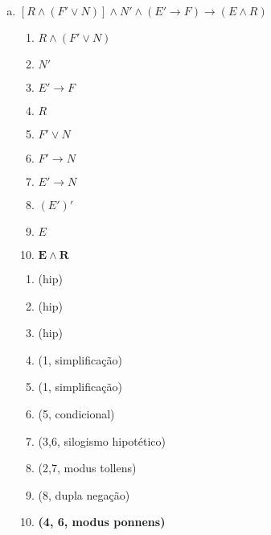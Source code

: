\begin{Gabarito}{12}
\begin{enumerate}[a)]
\begin{multicols}{2}
        \columnbreak

        \begin{enumerate}[\ding{32}]
          \item (hip)
          \item (hip)
          \item (hip)
          \item (1,3, modus tollens)
          \item (5, dupla negação)
          \item (5, condicional)
          \item \textbf{(4, 6, modus ponnens)}
        \end{enumerate}

      \end{multicols}

      \item $[R \land (F' \lor N)] \land N' \land (E'\rightarrow F) \rightarrow (E \land R)$ \\
      \begin{multicols}{2}

        \begin{enumerate}[1.]
          \item $R \land (F' \lor N)$
          \item $N'$
          \item $E'\rightarrow F$
          \item $R$
          \item $F' \lor N$
          \item $F' \rightarrow N$
          \item $E' \rightarrow N$
          \item $(E')'$
          \item $E$
          \item $\boldsymbol{E \land R}$
        \end{enumerate}

        \columnbreak

        \begin{enumerate}[\ding{32}]
          \item (hip)
          \item (hip)
          \item (hip)
          \item (1, simplificação)
          \item (1, simplificação)
          \item (5, condicional)
          \item (3,6, silogismo hipotético)
          \item (2,7, modus tollens)
          \item (8, dupla negação)
          \item \textbf{(4, 6, modus ponnens)}
        \end{enumerate}


\end{multicols}
\end{enumerate}
\end{Gabarito}
